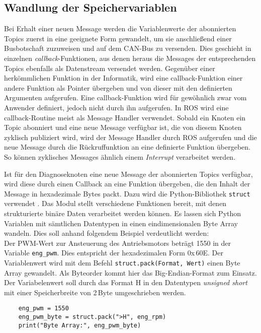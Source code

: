 \subsection{Wandlung der Speichervariablen} \label{subsec:WandlungSpeichervariblen}
Bei Erhalt einer neuen Message werden die Variablenwerte der abonnierten Topics zuerst in eine geeignete Form gewandelt, um sie anschließend einer Busbotschaft zuzuweisen und auf dem CAN-Bus zu versenden. Dies geschieht in einzelnen \emph{callback}-Funktionen, aus denen heraus die Messages der entsprechenden Topics ebenfalls als Datenstream versendet werden. Gegenüber einer herkömmlichen Funktion in der Informatik, wird eine callback-Funktion einer andere Funktion als Pointer übergeben und von dieser mit den definierten Argumenten aufgerufen. Eine callback-Funktion wird für gewöhnlich zwar vom Anwender definiert, jedoch nicht durch ihn aufgerufen. In ROS wird eine callback-Routine meist als Message Handler verwendet. Sobald ein Knoten ein Topic abonniert und eine neue Message verfügbar ist, die von diesem Knoten zyklisch publiziert wird, wird der Message Handler durch ROS aufgerufen und die neue Message durch die Rückruffunktion an eine definierte Funktion übergeben. So können zyklisches Messages ähnlich einem \emph{Interrupt} verarbeitet werden.

Ist für den Diagnoseknoten eine neue Message der abonnierten Topics verfügbar, wird diese durch einen Callback an eine Funktion übergeben, die den Inhalt der Message in hexadezimale Bytes packt. Dazu wird die Python-Bibliothek \texttt{struct} verwendet \cite{PythonSoftwareFoundation.2018}. Das Modul stellt verschiedene Funktionen bereit, mit denen strukturierte binäre Daten verarbeitet werden können. Es lassen sich Python Variablen mit sämtlichen Datentypen in einen eindimensionalen Byte Array wandeln. Dies soll anhand folgendem Beispiel verdeutlicht werden:\\
Der PWM-Wert zur Ansteuerung des Antriebsmotors beträgt 1550 in der Variable \texttt{eng\_pwm}. Dies entspricht der hexadezimalen Form 0x\,60E. Der Variablenwert wird mit dem Befehl \texttt{struct.pack(\grqq{}Format\grqq{}, \grqq{}Wert\grqq{})} einen Byte Array gewandelt. Als Byteorder kommt hier das Big-Endian-Format zum Einsatz. Der Variabelenwert soll durch das Format H in den Datentypen \emph{unsigned short} mit einer Speicherbreite von 2\,Byte umgeschrieben werden.
\begin{addmargin}[1cm]{0cm} 
	\begin{verbatim}
	eng_pwm = 1550
	eng_pwm_byte = struct.pack(">H", eng_rpm)
	print("Byte Array:", eng_pwm_byte)
	\end{verbatim}
\end{addmargin}

